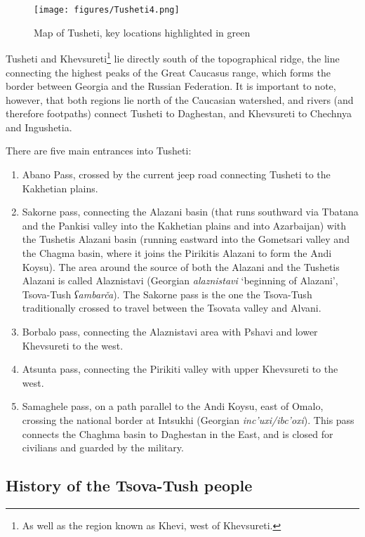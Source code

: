 \begin{figure}
	\texttt{[image: figures/Tusheti4.png]}
	\caption{Map of Tusheti, key locations highlighted in green}
	\label{map-tusheti}
\end{figure}

Tusheti and Khevsureti\footnote{As well as the region known as Khevi, west of Khevsureti.} lie directly south of the topographical ridge, the line connecting the highest peaks of the Great Caucasus range, which forms the border between Georgia and the Russian Federation. It is important to note, however, that both regions lie north of the Caucasian watershed, and rivers (and therefore footpaths) connect Tusheti to Daghestan, and Khevsureti to Chechnya and Ingushetia.

There are five main entrances into Tusheti:
\begin{enumerate}
	\item Abano Pass, crossed by the current jeep road connecting Tusheti to the Kakhetian plains. 
	
	\item Sakorne pass, connecting the Alazani basin (that runs southward via Tbatana and the Pankisi valley into the Kakhetian plains and into Azarbaijan) with the Tushetis Alazani basin (running eastward into the Gometsari valley and the Chagma basin, where it joins the Pirikitis Alazani to form the Andi Koysu). The area around the source of both the Alazani and the Tushetis Alazani is called Alaznistavi (Georgian \textit{alaznistavi} `beginning of Alazani', Tsova-Tush \textit{ʕambarča}). The Sakorne pass is the one the Tsova-Tush traditionally crossed to travel between the Tsovata valley and Alvani.
	
	\item Borbalo pass, connecting the Alaznistavi area with Pshavi and lower Khevsureti to the west.
	
	\item Atsunta pass, connecting the Pirikiti valley with upper Khevsureti to the west.
	
	\item Samaghele pass, on a path parallel to the Andi Koysu, east of Omalo, crossing the national border at Intsukhi (Georgian \textit{inc'uxi/ibc'oxi}). This pass connects the Chaghma basin to Daghestan in the East, and is closed for civilians and guarded by the military.
	
\end{enumerate}

\subsection{History of the Tsova-Tush people} \label{history}

